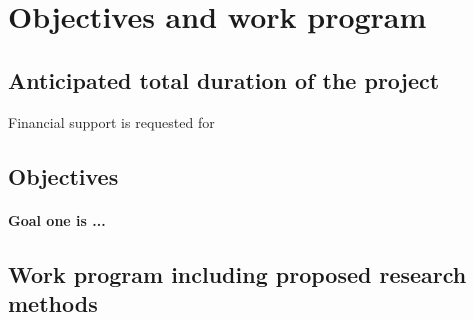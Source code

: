 \documentclass{scrartcl}
\begin{document}




\section{Objectives and work program}

\subsection{Anticipated total duration of the project}
Financial support is requested for 

\subsection{Objectives}
\let\oldpara=\theparagraph
\addtocounter{secnumdepth}{1}
\renewcommand{\theparagraph}{Goal \arabic{paragraph}}

\paragraph{\textnormal{Goal one is ...}}

\subsection{Work program including proposed research methods}
\end{document}
